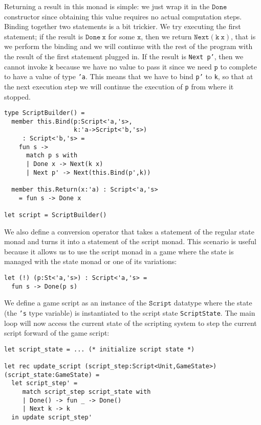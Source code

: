 Returning a result in this monad is simple: we just wrap it in the
$\mathtt{Done}$ constructor since obtaining this value  requires no
actual computation steps. Binding together two statements is a bit
trickier. We try executing the first statement; if the result is
$\mathtt{Done\ x}$ for some  $\mathtt{x}$, then we return
$\mathtt{Next(k\ x)}$, that is we perform the binding and we 
will continue with the rest of the program with the result of the first
statement plugged in. If the result is \texttt{Next\ p'}, then we cannot
invoke $\mathtt{k}$ because we have no value to pass it since we need 
$\mathtt{p}$ to complete to have a value of type \texttt{'a}. This means
that we have to bind \texttt{p'} to \texttt{k}, so that at the next
execution step we will continue the execution of \texttt{p} from where
it stopped.

\begin{lstlisting}
type ScriptBuilder() = 
  member this.Bind(p:Script<'a,'s>,
                   k:'a->Script<'b,'s>)
     : Script<'b,'s> =
    fun s ->
      match p s with
      | Done x -> Next(k x)
      | Next p' -> Next(this.Bind(p',k))

  member this.Return(x:'a) : Script<'a,'s> 
    = fun s -> Done x

let script = ScriptBuilder()
\end{lstlisting}

We also define a conversion operator that takes a statement of the
regular state monad and turns it into a statement of the script
monad. This scenario is useful because it allows us to use the script
monad in a game where the state is managed with the state monad or one
of its variations: 

\begin{lstlisting}
let (!) (p:St<'a,'s>) : Script<'a,'s> = 
  fun s -> Done(p s)
\end{lstlisting}

We define a game script as an instance of the $\mathtt{Script}$
datatype where the state (the \texttt{'s} type variable) is
instantiated to the script state \texttt{ScriptState}. The main loop will
now access the current state of the scripting system to step the current script forward of the game
script: 

\begin{lstlisting}
let script_state = ... (* initialize script state *)

let rec update_script (script_step:Script<Unit,GameState>) (script_state:GameState) =
  let script_step' = 
     match script_step script_state with
     | Done() -> fun _ -> Done()
     | Next k -> k
  in update script_step'
\end{lstlisting}

